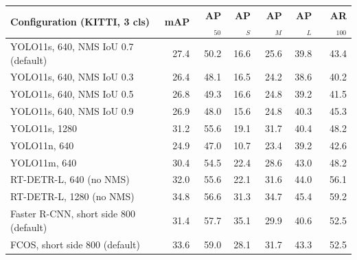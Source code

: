 \begin{tabular}{lrrrrrr}
\toprule
Configuration (KITTI, 3 cls) & mAP & AP$_{50}$ & AP$_S$ & AP$_M$ & AP$_L$ & AR$_{100}$ \\
\midrule
YOLO11s, 640, NMS IoU 0.7 (default) & 27.4 & 50.2 & 16.6 & 25.6 & 39.8 & 43.4 \\
YOLO11s, 640, NMS IoU 0.3 & 26.4 & 48.1 & 16.5 & 24.2 & 38.6 & 40.2 \\
YOLO11s, 640, NMS IoU 0.5 & 26.8 & 49.3 & 16.6 & 24.8 & 39.2 & 41.5 \\
YOLO11s, 640, NMS IoU 0.9 & 26.9 & 48.0 & 15.6 & 24.8 & 40.3 & 45.3 \\
YOLO11s, 1280 & 31.2 & 55.6 & 19.1 & 31.7 & 40.4 & 48.2 \\
YOLO11n, 640 & 24.9 & 47.0 & 10.7 & 23.4 & 39.2 & 42.6 \\
YOLO11m, 640 & 30.4 & 54.5 & 22.4 & 28.6 & 43.0 & 48.2 \\
RT-DETR-L, 640 (no NMS) & 32.0 & 55.6 & 22.1 & 31.6 & 44.0 & 56.1 \\
RT-DETR-L, 1280 (no NMS) & 34.8 & 56.6 & 31.3 & 34.7 & 45.4 & 59.2 \\
Faster R-CNN, short side 800 (default) & 31.4 & 57.7 & 35.1 & 29.9 & 40.6 & 52.5 \\
FCOS, short side 800 (default) & 33.6 & 59.0 & 28.1 & 31.7 & 43.3 & 52.5 \\
\bottomrule
\end{tabular}
